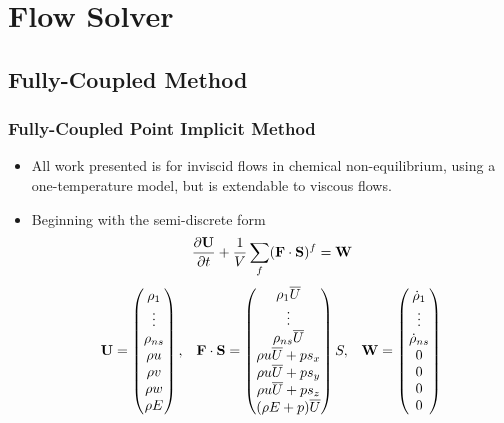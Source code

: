 \documentclass{beamer}
\begin{document}
\section{Flow Solver}

\subsection{Fully-Coupled Method}
\begin{frame}
  \frametitle{Fully-Coupled Point Implicit Method}
  \begin{itemize}
    \item All work presented is for inviscid flows in chemical non-equilibrium,
      using a one-temperature model, but is extendable to viscous flows.
    \item Beginning with the semi-discrete form
    \begin{equation*}
    	\label{inv_flux_fv}
    	\frac{\partial \mathbf U}{\partial t}
    	 + \frac{1}{V}\sum\limits_{f}(\mathbf F\cdot\mathbf S)^f = \mathbf W
    \end{equation*}
    \begin{equation*}
    	\begin{matrix}
    	\mathbf U=\begin{pmatrix}
       		\rho_1\\
    		\vdots \\
    		\rho_{ns} \\
    		\rho u \\
    		\rho v \\
    		\rho w \\
    		\rho E \\
    	\end{pmatrix},      &
     	\mathbf{F \cdot S} = \begin{pmatrix}
    		\rho_1  \overline{U} \\
    		\vdots \\
    		\rho_{ns} \overline{U} \\
    		\rho u \overline{U} + p s_x\\
    		\rho u \overline{U} + p s_y\\
    		\rho u \overline{U} + p s_z\\
    		(\rho E + p) \overline{U} \\
    	\end{pmatrix}S,    &
     	\mathbf W = \begin{pmatrix}
        \dot\rho_1\\
    		\vdots \\
    		\dot\rho_{ns} \\
        0 \\
        0 \\
        0 \\
        0
      \end{pmatrix}

  	\end{matrix}
  \end{equation*}

  \end{itemize}
\end{frame}
\end{document}
